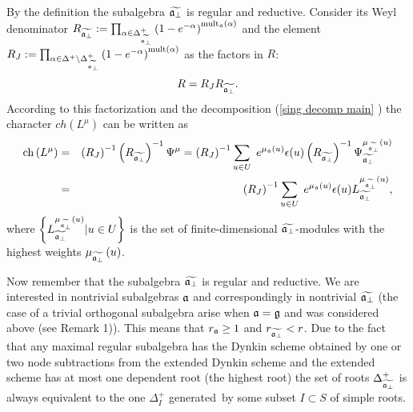 \documentclass[12pt]{article}
\theoremstyle{definition}
\begin{document}
\bigskip By the definition the subalgebra $\widetilde{\frak{a}_{\perp }}$ is
regular and reductive. Consider its Weyl denominator $R_{\widetilde{\frak{a}%
_{\perp }}}:=\prod_{\alpha \in \Delta _{\widetilde{\frak{a}_{\perp }}%
}^{+}}\left( 1-e^{-\alpha }\right) ^{\mathrm{mult}_{\frak{a}}\mathrm{\left(
\alpha \right) }}$ and the element $R_{J}:=\prod_{\alpha \in \Delta
^{+}\setminus \Delta _{\widetilde{\frak{a}_{\perp }}}^{+}}\left(
1-e^{-\alpha }\right) ^{\mathrm{mult}(\alpha )}$ as the factors in $R$: $%
\quad $%
\[
R=R_{J}R_{\widetilde{\frak{a}_{\perp }}}.
\]
According to this factorization and the decomposition (\ref{sing decomp main}%
) the character $ch\left( L^{\mu }\right) $ can be written as
\begin{eqnarray*}
\mathrm{ch}\left( L^{\mu }\right) &=&\left( R_{J}\right) ^{-1}\left( R_{%
\widetilde{\frak{a}_{\perp }}}\right) ^{-1}\Psi ^{\mu }=\left( R_{J}\right)
^{-1}\sum_{u\in U}\;e^{\mu _{\frak{a}}\left( u\right) }\epsilon (u)\left( R_{%
\widetilde{\frak{a}_{\perp }}}\right) ^{-1}\Psi _{\widetilde{\frak{a}_{\perp
}}}^{\mu _{\widetilde{\frak{a}_{\perp }}}\left( u\right) } \\
&=&\left( R_{J}\right) ^{-1}\sum_{u\in U}\;e^{\mu _{\frak{a}}\left( u\right)
}\epsilon (u)L_{\widetilde{\frak{a}_{\perp }}}^{\mu _{\widetilde{\frak{a}%
_{\perp }}}\left( u\right) },
\end{eqnarray*}
where $\left\{ L_{\widetilde{\frak{a}_{\perp }}}^{\mu _{\widetilde{\frak{a}%
_{\perp }}}\left( u\right) }|u\in U\right\} $ is the set of
finite-dimensional $\widetilde{\frak{a}_{\perp }}$-modules with the highest
weights $\mu _{\widetilde{\frak{a}_{\perp }}}\left( u\right) $.

Now remember that the subalgebra $\widetilde{\frak{a}_{\perp }}$ is regular
and reductive. We are interested in nontrivial subalgebras $\frak{a}$ and
correspondingly in nontrivial $\widetilde{\frak{a}_{\perp }}$ (the case of a
trivial orthogonal subalgebra arise when $\frak{a}=\frak{g}$ and was
considered above (see Remark 1)). This means that $r_{\frak{a}}\geq 1$ and $%
r_{\widetilde{\frak{a}_{\perp }}}<r$. Due to the fact that any maximal
regular subalgebra has the Dynkin scheme obtained by one or two node
subtractions from the extended Dynkin scheme and the extended scheme has at
most one dependent root (the highest root) the set of roots $\Delta _{%
\widetilde{\frak{a}_{\perp }}}^{+}$ is always equivalent to the one $\Delta
_{I}^{+}$ generated\ by some subset $I\subset S$ of simple roots.
\end{document}

